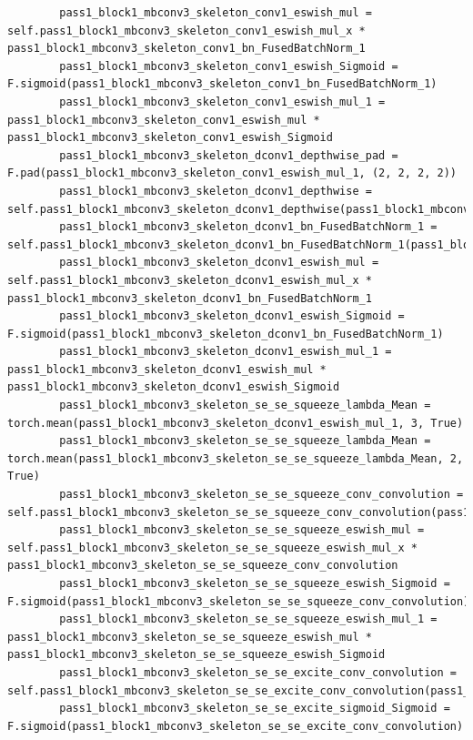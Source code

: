 \documentclass{fisatprojectfinal}
\begin{document}
\begin{appendices}
\begin{lstlisting}
        pass1_block1_mbconv3_skeleton_conv1_eswish_mul = self.pass1_block1_mbconv3_skeleton_conv1_eswish_mul_x * pass1_block1_mbconv3_skeleton_conv1_bn_FusedBatchNorm_1
        pass1_block1_mbconv3_skeleton_conv1_eswish_Sigmoid = F.sigmoid(pass1_block1_mbconv3_skeleton_conv1_bn_FusedBatchNorm_1)
        pass1_block1_mbconv3_skeleton_conv1_eswish_mul_1 = pass1_block1_mbconv3_skeleton_conv1_eswish_mul * pass1_block1_mbconv3_skeleton_conv1_eswish_Sigmoid
        pass1_block1_mbconv3_skeleton_dconv1_depthwise_pad = F.pad(pass1_block1_mbconv3_skeleton_conv1_eswish_mul_1, (2, 2, 2, 2))
        pass1_block1_mbconv3_skeleton_dconv1_depthwise = self.pass1_block1_mbconv3_skeleton_dconv1_depthwise(pass1_block1_mbconv3_skeleton_dconv1_depthwise_pad)
        pass1_block1_mbconv3_skeleton_dconv1_bn_FusedBatchNorm_1 = self.pass1_block1_mbconv3_skeleton_dconv1_bn_FusedBatchNorm_1(pass1_block1_mbconv3_skeleton_dconv1_depthwise)
        pass1_block1_mbconv3_skeleton_dconv1_eswish_mul = self.pass1_block1_mbconv3_skeleton_dconv1_eswish_mul_x * pass1_block1_mbconv3_skeleton_dconv1_bn_FusedBatchNorm_1
        pass1_block1_mbconv3_skeleton_dconv1_eswish_Sigmoid = F.sigmoid(pass1_block1_mbconv3_skeleton_dconv1_bn_FusedBatchNorm_1)
        pass1_block1_mbconv3_skeleton_dconv1_eswish_mul_1 = pass1_block1_mbconv3_skeleton_dconv1_eswish_mul * pass1_block1_mbconv3_skeleton_dconv1_eswish_Sigmoid
        pass1_block1_mbconv3_skeleton_se_se_squeeze_lambda_Mean = torch.mean(pass1_block1_mbconv3_skeleton_dconv1_eswish_mul_1, 3, True)
        pass1_block1_mbconv3_skeleton_se_se_squeeze_lambda_Mean = torch.mean(pass1_block1_mbconv3_skeleton_se_se_squeeze_lambda_Mean, 2, True)
        pass1_block1_mbconv3_skeleton_se_se_squeeze_conv_convolution = self.pass1_block1_mbconv3_skeleton_se_se_squeeze_conv_convolution(pass1_block1_mbconv3_skeleton_se_se_squeeze_lambda_Mean)
        pass1_block1_mbconv3_skeleton_se_se_squeeze_eswish_mul = self.pass1_block1_mbconv3_skeleton_se_se_squeeze_eswish_mul_x * pass1_block1_mbconv3_skeleton_se_se_squeeze_conv_convolution
        pass1_block1_mbconv3_skeleton_se_se_squeeze_eswish_Sigmoid = F.sigmoid(pass1_block1_mbconv3_skeleton_se_se_squeeze_conv_convolution)
        pass1_block1_mbconv3_skeleton_se_se_squeeze_eswish_mul_1 = pass1_block1_mbconv3_skeleton_se_se_squeeze_eswish_mul * pass1_block1_mbconv3_skeleton_se_se_squeeze_eswish_Sigmoid
        pass1_block1_mbconv3_skeleton_se_se_excite_conv_convolution = self.pass1_block1_mbconv3_skeleton_se_se_excite_conv_convolution(pass1_block1_mbconv3_skeleton_se_se_squeeze_eswish_mul_1)
        pass1_block1_mbconv3_skeleton_se_se_excite_sigmoid_Sigmoid = F.sigmoid(pass1_block1_mbconv3_skeleton_se_se_excite_conv_convolution)

\end{lstlisting}
\end{appendices}
\end{document}
